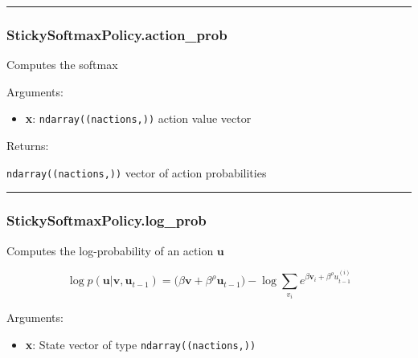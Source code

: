\begin{center}\rule{0.5\linewidth}{\linethickness}\end{center}

\subsubsection{StickySoftmaxPolicy.action\_prob}\label{stickysoftmaxpolicy.action_prob}

\begin{Shaded}
\begin{Highlighting}[]
\end{Highlighting}
\end{Shaded}

Computes the softmax

Arguments:

\begin{itemize}
\tightlist
\item
  \textbf{x}: \texttt{ndarray((nactions,))} action value vector
\end{itemize}

Returns:

\texttt{ndarray((nactions,))} vector of action probabilities

\begin{center}\rule{0.5\linewidth}{\linethickness}\end{center}

\subsubsection{StickySoftmaxPolicy.log\_prob}\label{stickysoftmaxpolicy.log_prob}

\begin{Shaded}
\begin{Highlighting}[]
\end{Highlighting}
\end{Shaded}

Computes the log-probability of an action \(\mathbf u\)

\[
\log p(\mathbf u|\mathbf v, \mathbf u_{t-1}) = \big(\beta \mathbf v + \beta^\rho \mathbf u_{t-1}) - \log \sum_{v_i} e^{\beta \mathbf v_i + \beta^\rho u_{t-1}^{(i)}}
\]

Arguments:

\begin{itemize}
\tightlist
\item
  \textbf{x}: State vector of type \texttt{ndarray((nactions,))}
\end{itemize}


